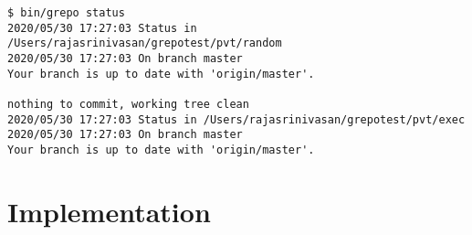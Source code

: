 \documentclass[11pt, a4paper]{article} %
\begin{document}
\begin{lstlisting}[caption= Example of status]
$ bin/grepo status
2020/05/30 17:27:03 Status in /Users/rajasrinivasan/grepotest/pvt/random
2020/05/30 17:27:03 On branch master
Your branch is up to date with 'origin/master'.

nothing to commit, working tree clean
2020/05/30 17:27:03 Status in /Users/rajasrinivasan/grepotest/pvt/exec
2020/05/30 17:27:03 On branch master
Your branch is up to date with 'origin/master'.
\end{lstlisting}

\section{Implementation}
\end{document}
